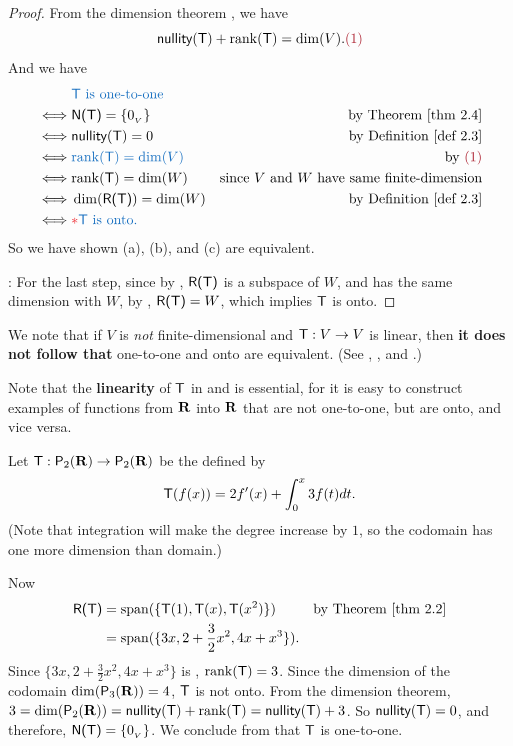 \begin{proof}
From the dimension theorem , we have
\[
    \nullityT + \rankT = \dim(V). \MAROON{(1)}
\]
And we have
\begin{align*}
         & \BLUE{\T \text{ is one-to-one }} \\
    \iff & \NULLT = \{ \OV \} & \text{by \THM{2.4}} \\
    \iff & \nullityT = 0 & \text{by \DEF{2.3}} \\
    \iff & \BLUE{\rankT = \dim(V)} & \text{by \MAROON{(1)}} \\
    \iff & \rankT = \dim(W) & \text{since \(V\) and \(W\) have same finite-dimension} \\
    \iff & \dim(\RANGET) = \dim(W) & \text{by \DEF{2.3}} \\
    \iff & \RED{*} \BLUE{\T \text{ is onto.}}
\end{align*}
So we have shown (a), (b), and (c) are equivalent.

\RED{*}: For the last step, since by , \(\textsf{R(T)}\) is a subspace of \(W\), and has the same dimension with \(W\), by , \(\textsf{R(T)} = W\), which implies \(\textsf{T}\) is onto.
\end{proof}

\begin{remark} \label{remark 2.1.10}
We note that if \(V\) is \emph{not} finite-dimensional and \(\textsf{T} : V \to V\) is linear, then \textbf{it does not follow that} one-to-one and onto are equivalent.
(See , , and .)

Note that the \textbf{linearity} of \(\textsf{T}\) in  and  is essential, for it is easy to construct examples of functions from \(\mathbf{R}\) into \(\mathbf{R}\) that are not one-to-one, but
are onto, and vice versa.
\end{remark}

\begin{example} \label{example 2.1.11}
Let \(\textsf{T} : \textsf{P}_2(\mathbf{R}) \to \textsf{P}_2(\mathbf{R})\) be the \LTRAN{} defined by
\[
    \textsf{T}(f(x)) = 2f'(x) + \int_0^x 3f(t) dt.
\]
(Note that integration will make the degree increase by \(1\), so the codomain has one more dimension than domain.)

Now
\begin{align*}
    \RANGET & = \spann(\{ \T(1), \T(x), \T(x^2) \}) & \text{by \THM{2.2}} \\
            & = \spann(\{ 3x, 2 + \frac{3}{2} x^2, 4x + x^3 \}).
\end{align*}
Since \(\{ 3x, 2 + \frac{3}{2} x^2, 4x + x^3 \}\) is \LID{}, \(\mathrm{rank}(\textsf{T}) = 3\).
Since the dimension of the codomain \(\dim(\textsf{P}_3(\mathbf{R})) = 4\), \(\textsf{T}\) is not onto.
From the dimension theorem, \(3 = \dim(\textsf{P}_2(\mathbf{R})) = \textsf{nullity}(\textsf{T}) + \mathrm{rank}(\textsf{T}) = \textsf{nullity}(\textsf{T}) + 3\).
So \(\textsf{nullity}(\textsf{T}) = 0\), and therefore, \(\textsf{N(T)} = \{ 0_{_V} \}\).
We conclude from  that \(\textsf{T}\) is one-to-one.
\end{example}

